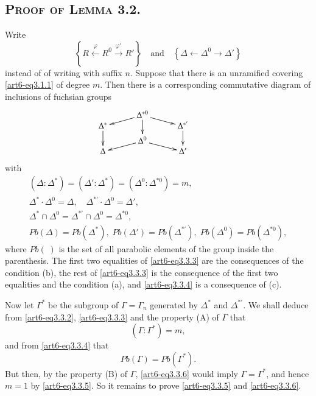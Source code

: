 \subsection{\textsc{Proof of Lemma} 3.2.}\label{art6-subsec3.3}
Write
$$
\left\{R \xleftarrow{\varphi} R^0 \xrightarrow{\varphi'} R' \right\} \text{~~ and ~~} \left\{\Delta \longleftarrow \Delta^0 \longrightarrow \Delta' \right\}
$$
instead of \pageoriginale of writing with suffix $n$. Suppose that there is an unramified covering \eqref{art6-eq3.1.1} of degree $m$. Then there is a corresponding commutative diagram of inclusions of fuchsian groups
\setcounter{equation}{0}
\begin{equation}
\vcenter{
\xymatrix@R=-0.05cm@C=1cm{
& \Delta^{\ast 0} \ar[dr] \ar[dl] \ar[ddd] & \\
\Delta^\ast \ar[ddd] &&  \Delta^{\ast'} \ar[ddd]\\
& & &\\
& \Delta^0 \ar[dr]  \ar[dl] & \\
\Delta & & \Delta'}
}\label{art6-eq3.3.1}
\end{equation}
with 
\begin{gather}
(\Delta: \Delta^\ast) = (\Delta' : \Delta^\ast) = (\Delta^0 : \Delta^{\ast 0}) = m, \label{art6-eq3.3.2}\\
\Delta^\ast \cdot \Delta^0 = \Delta, \quad \Delta^{\ast'} \cdot \Delta^0 = \Delta', \tag*{$|$\quad~}\\
\Delta^\ast \cap \Delta^0 = \Delta^{\ast'} \cap \Delta^0 = \Delta^{\ast 0}, \label{art6-eq3.3.3}\\
Pb(\Delta) = Pb (\Delta^\ast), \;Pb (\Delta') = Pb (\Delta^{\ast'}) , \;Pb (\Delta^0) = Pb (\Delta^{\ast 0}), \label{art6-eq3.3.4}
\end{gather}
where $Pb (\;)$ is the set of all parabolic elements of the group inside the parenthesis. The first two equalities of \eqref{art6-eq3.3.3} are the consequences of the condition (b), the rest of \eqref{art6-eq3.3.3} is the consequence of the first two equalities and the condition (a), and \eqref{art6-eq3.3.4} is a consequence of (c).

Now let $\Gamma^\ast$ be the subgroup of $\Gamma = \Gamma_n$ generated by $\Delta^\ast$ and $\Delta^{\ast'}$. We shall deduce from \eqref{art6-eq3.3.2}, \eqref{art6-eq3.3.3} and the property (A) of $\Gamma$ that 
\begin{equation}
(\Gamma: \Gamma^\ast ) = m, \label{art6-eq3.3.5}
\end{equation}
and from \eqref{art6-eq3.3.4} that 
\begin{equation}
Pb (\Gamma) = P b(\Gamma^\ast). \label{art6-eq3.3.6}
\end{equation}
But then, by the property (B) of $\Gamma$, \eqref{art6-eq3.3.6} would imply $\Gamma = \Gamma^\ast$, and hence $m =1$ by \eqref{art6-eq3.3.5}. So it remains to prove \eqref{art6-eq3.3.5} and \eqref{art6-eq3.3.6}. 

